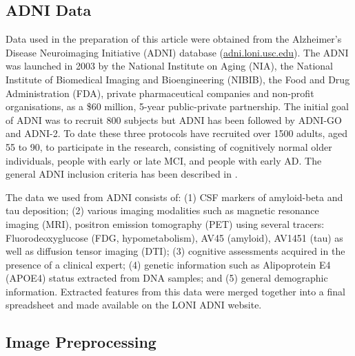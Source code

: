 \subsection{ADNI Data}

Data used in the preparation of this article were obtained from the Alzheimer's Disease Neuroimaging Initiative (ADNI) database (\url{adni.loni.usc.edu}). The ADNI was launched in 2003 by the National Institute on Aging (NIA), the National Institute of Biomedical Imaging and Bioengineering (NIBIB), the Food and Drug Administration (FDA), private pharmaceutical companies and non-profit organisations, as a \$60 million, 5-year public-private partnership. The initial goal of ADNI was to recruit 800 subjects but ADNI has been followed by ADNI-GO and ADNI-2. To date these three protocols have recruited over 1500 adults, aged 55 to 90, to participate in the research, consisting of cognitively normal older individuals, people with early or late MCI, and people with early AD. The general ADNI inclusion criteria has been described in \cite{petersen2010alzheimer}. 

The data we used from ADNI consists of: (1) CSF markers of amyloid-beta and tau deposition; (2) various imaging modalities such as magnetic resonance imaging (MRI), positron emission tomography (PET) using several tracers: Fluorodeoxyglucose (FDG, hypometabolism), AV45 (amyloid), AV1451 (tau) as well as diffusion tensor imaging (DTI); (3) cognitive assessments acquired in the presence of a clinical expert; (4) genetic information such as Alipoprotein E4 (APOE4) status extracted from DNA samples; and (5) general demographic information. Extracted features from this data were merged together into a final spreadsheet and made available on the LONI ADNI website.

\subsection{Image Preprocessing}

